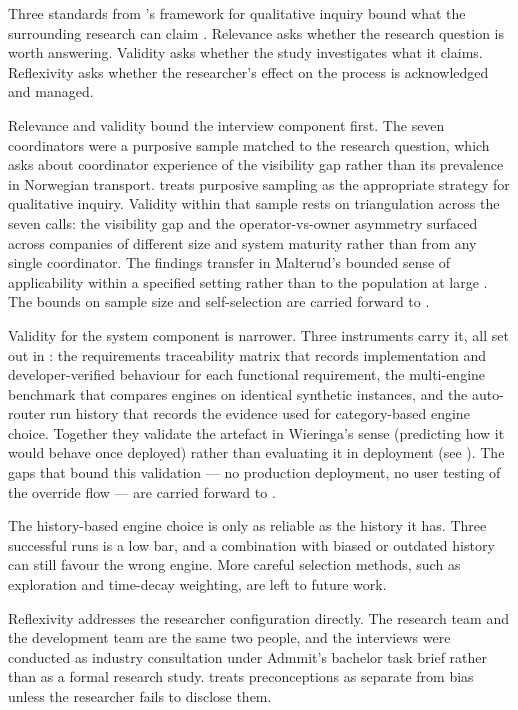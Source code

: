 Three standards from \textcite{malterud2001lancet}'s framework for qualitative inquiry bound what the surrounding research can claim \parencite[p.~483]{malterud2001lancet}. Relevance asks whether the research question is worth answering. Validity asks whether the study investigates what it claims. Reflexivity asks whether the researcher's effect on the process is acknowledged and managed.

Relevance and validity bound the interview component first. The seven coordinators were a purposive sample matched to the research question, which asks about coordinator experience of the visibility gap rather than its prevalence in Norwegian transport. \textcite[p.~485]{malterud2001lancet} treats purposive sampling as the appropriate strategy for qualitative inquiry. Validity within that sample rests on triangulation across the seven calls: the visibility gap and the operator-vs-owner asymmetry surfaced across companies of different size and system maturity rather than from any single coordinator. The findings transfer in Malterud's bounded sense of applicability within a specified setting rather than to the population at large \parencite[p.~486]{malterud2001lancet}. The bounds on sample size and self-selection are carried forward to .

Validity for the system component is narrower. Three instruments carry it, all set out in : the requirements traceability matrix that records implementation and developer-verified behaviour for each functional requirement, the multi-engine benchmark that compares engines on identical synthetic instances, and the auto-router run history that records the evidence used for category-based engine choice. Together they validate the artefact in Wieringa's sense (predicting how it would behave once deployed) rather than evaluating it in deployment (see ). The gaps that bound this validation --- no production deployment, no user testing of the override flow --- are carried forward to .

The history-based engine choice is only as reliable as the history it has. Three successful runs is a low bar, and a combination with biased or outdated history can still favour the wrong engine. More careful selection methods, such as exploration and time-decay weighting, are left to future work.

Reflexivity addresses the researcher configuration directly. The research team and the development team are the same two people, and the interviews were conducted as industry consultation under Admmit's bachelor task brief rather than as a formal research study. \textcite[p.~484]{malterud2001lancet} treats preconceptions as separate from bias unless the researcher fails to disclose them.

